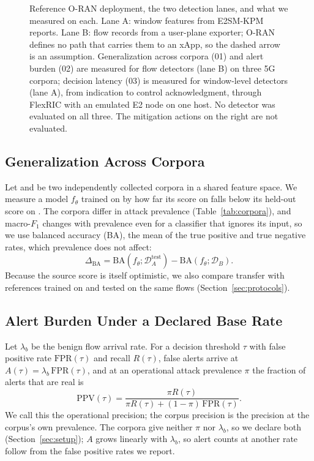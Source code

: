 \begin{figure}[t]
\centering
\resizebox{0.97\textwidth}{!}{}
\caption{Reference O-RAN deployment, the two detection lanes, and what we measured on each. Lane A: window features from E2SM-KPM reports. Lane B: flow records from a user-plane exporter; O-RAN defines no path that carries them to an xApp, so the dashed arrow is an assumption. Generalization across corpora (01) and alert burden (02) are measured for flow detectors (lane B) on three 5G corpora; decision latency (03) is measured for window-level detectors (lane A), from indication to control acknowledgment, through FlexRIC with an emulated E2 node on one host. No detector was evaluated on all three. The mitigation actions on the right are not evaluated.}
\label{fig:arch}
\end{figure}

\subsection{Generalization Across Corpora}

Let \DA{} and \DB{} be two independently collected corpora in a shared feature space. We measure a model $f_{\theta}$ trained on \DA{} by how far its score on \DB{} falls below its held-out score on \DA{}. The corpora differ in attack prevalence (Table~\ref{tab:corpora}), and macro-$F_1$ changes with prevalence even for a classifier that ignores its input, so we use balanced accuracy (BA), the mean of the true positive and true negative rates, which prevalence does not affect:
\begin{equation}
\Delta_{\mathrm{BA}} = \mathrm{BA}\!\left(f_{\theta};\mathcal{D}_{A}^{\mathrm{test}}\right) - \mathrm{BA}\!\left(f_{\theta};\mathcal{D}_{B}\right).
\label{eq:gap}
\end{equation}
Because the source score is itself optimistic, we also compare transfer with references trained on \DB{} and tested on the same \DB{} flows (Section~\ref{sec:protocols}).

\subsection{Alert Burden Under a Declared Base Rate}

Let $\lambda_{b}$ be the benign flow arrival rate. For a decision threshold $\tau$ with false positive rate $\mathrm{FPR}(\tau)$ and recall $R(\tau)$, false alerts arrive at $A(\tau) = \lambda_{b}\,\mathrm{FPR}(\tau)$, and at an operational attack prevalence $\pi$ the fraction of alerts that are real is
\begin{equation}
\mathrm{PPV}(\tau) = \frac{\pi R(\tau)}{\pi R(\tau) + (1-\pi)\,\mathrm{FPR}(\tau)}.
\label{eq:ppv}
\end{equation}
We call this the operational precision; the corpus precision is the precision at the corpus's own prevalence. The corpora give neither $\pi$ nor $\lambda_{b}$, so we declare both (Section~\ref{sec:setup}); $A$ grows linearly with $\lambda_{b}$, so alert counts at another rate follow from the false positive rates we report.

